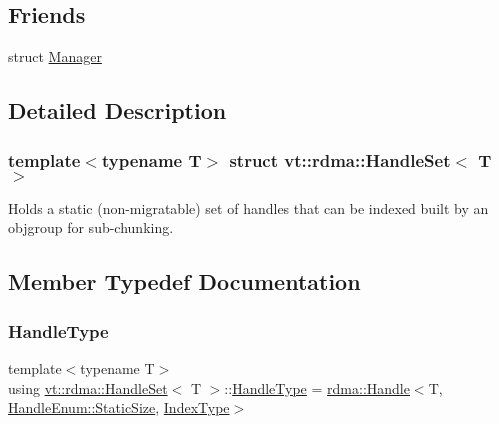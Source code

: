 \subsection*{Friends}
\begin{DoxyCompactItemize}
\item 
struct \hyperlink{structvt_1_1rdma_1_1_handle_set_a1fd6b9bc3f72bb2b64e602de3982929d}{Manager}
\end{DoxyCompactItemize}


\subsection{Detailed Description}
\subsubsection*{template$<$typename T$>$\newline
struct vt\+::rdma\+::\+Handle\+Set$<$ T $>$}

Holds a static (non-\/migratable) set of handles that can be indexed built by an objgroup for sub-\/chunking. 

\subsection{Member Typedef Documentation}
\mbox{\label{structvt_1_1rdma_1_1_handle_set_ab3a698ee86bae503dfa84617205b2dd9}} 
\subsubsection{\texorpdfstring{Handle\+Type}{HandleType}}
{\footnotesize\ttfamily template$<$typename T$>$ \\
using \hyperlink{structvt_1_1rdma_1_1_handle_set}{vt\+::rdma\+::\+Handle\+Set}$<$ T $>$\+::\hyperlink{structvt_1_1rdma_1_1_handle_set_ab3a698ee86bae503dfa84617205b2dd9}{Handle\+Type} =  \hyperlink{structvt_1_1rdma_1_1_handle}{rdma\+::\+Handle}$<$T, \hyperlink{namespacevt_1_1rdma_a0234ff19cfb3c04718cfdfd36b2d6d88a0c5c41d6a0319a61d3a5e8a060b7c4d7}{Handle\+Enum\+::\+Static\+Size}, \hyperlink{structvt_1_1rdma_1_1_handle_set_aa0dbb6a47c459fb4290f0ca96e573097}{Index\+Type}$>$}

\mbox{\label{structvt_1_1rdma_1_1_handle_set_aa0dbb6a47c459fb4290f0ca96e573097}} 
